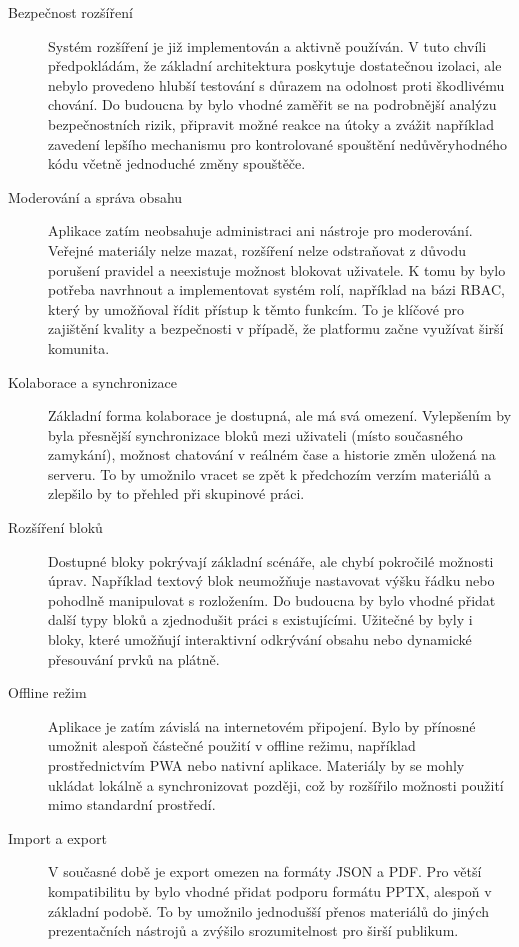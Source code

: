 \begin{description}
  \item[Bezpečnost rozšíření] Systém rozšíření je již implementován a aktivně používán. 
  V tuto chvíli předpokládám, že základní architektura poskytuje dostatečnou izolaci, ale nebylo provedeno hlubší testování s důrazem na odolnost proti škodlivému chování. 
  Do budoucna by bylo vhodné zaměřit se na podrobnější analýzu bezpečnostních rizik, připravit možné reakce na útoky a zvážit například zavedení lepšího mechanismu pro kontrolované spouštění nedůvěryhodného kódu včetně jednoduché změny spouštěče.

  \item[Moderování a správa obsahu] Aplikace zatím neobsahuje administraci ani nástroje pro moderování. 
  Veřejné materiály nelze mazat, rozšíření nelze odstraňovat z důvodu porušení pravidel a neexistuje možnost blokovat uživatele. 
  K tomu by bylo potřeba navrhnout a implementovat systém rolí, například na bázi RBAC, který by umožňoval řídit přístup k těmto funkcím. To je klíčové pro zajištění kvality a bezpečnosti v případě, že platformu začne využívat širší komunita.

  \item[Kolaborace a synchronizace] Základní forma kolaborace je dostupná, ale má svá omezení.
  Vylepšením by byla přesnější synchronizace bloků mezi uživateli (místo současného zamykání), možnost chatování v reálném čase a historie změn uložená na serveru. 
  To by umožnilo vracet se zpět k předchozím verzím materiálů a zlepšilo by to přehled při skupinové práci.

  \item[Rozšíření bloků] Dostupné bloky pokrývají základní scénáře, ale chybí pokročilé možnosti úprav. 
  Například textový blok neumožňuje nastavovat výšku řádku nebo pohodlně manipulovat s rozložením. 
  Do budoucna by bylo vhodné přidat další typy bloků a zjednodušit práci s existujícími.
  Užitečné by byly i bloky, které umožňují interaktivní odkrývání obsahu nebo dynamické přesouvání prvků na plátně.

  \item[Offline režim] Aplikace je zatím závislá na internetovém připojení. 
  Bylo by přínosné umožnit alespoň částečné použití v offline režimu, například prostřednictvím PWA nebo nativní aplikace. 
  Materiály by se mohly ukládat lokálně a synchronizovat později, což by rozšířilo možnosti použití mimo standardní prostředí.

  \item[Import a export] V současné době je export omezen na formáty JSON a PDF. 
  Pro větší kompatibilitu by bylo vhodné přidat podporu formátu PPTX, alespoň v základní podobě. 
  To by umožnilo jednodušší přenos materiálů do jiných prezentačních nástrojů a zvýšilo srozumitelnost pro širší publikum.


\end{description}
